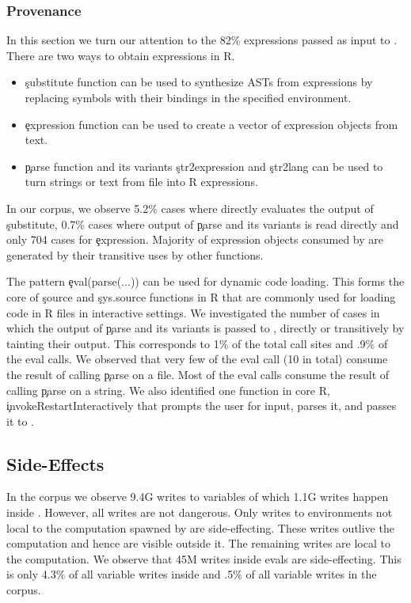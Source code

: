 \documentclass[conference]{IEEEtran}
\newcommand{\AllWritesRnd}{9.4G\xspace}
\newcommand{\EvalWritesRnd}{1.1G\xspace}
\newcommand{\EvalSideEffectingWritesRnd}{45M\xspace}
\newcommand{\EvalSideEffectingWritesEvalPerc}{4.3\%\xspace}
\newcommand{\EvalSideEffectingWritesAllPerc}{.5\%\xspace}
\newcommand{\AllExpressionInputEvalCallPerc}{82\%\xspace}
\newcommand{\PercentParsedEvals}{.9\%\xspace}
\newcommand{\PercentParsedCallSites}{1\%\xspace}
\newcommand{\NbParseFilesRnd}{10\xspace}
\begin{document}
\subsubsection{Provenance}

In this section we turn our attention to the \AllExpressionInputEvalCallPerc
expressions passed as input to \eval. There are two ways to obtain
expressions in R.
\begin{itemize}
  \item \c{substitute} function can be used to synthesize ASTs from
    expressions by replacing symbols with their bindings in the specified
    environment.
  \item \c{expression} function can be used to create a vector of expression
    objects from text.
  \item \c{parse} function and its variants \c{str2expression} and
    \c{str2lang} can be used to turn strings or text from file into R
    expressions.
\end{itemize}

In our corpus, we observe 5.2\% cases where \eval directly evaluates the
output of \c{substitute}, 0.7\% cases where output of \c{parse} and its
variants is read directly and only 704 cases for \c{expression}. Majority of
expression objects consumed by \eval are generated by their transitive uses
by other functions.

The pattern \c{eval(parse(...))} can be used for dynamic code loading. This
forms the core of \c{source} and \c{sys.source} functions in R that are
commonly used for loading code in R files in interactive settings. We
investigated the number of cases in which the output of \c{parse} and its
variants is passed to \eval, directly or transitively by tainting their
output. This corresponds to \PercentParsedCallSites of the total \eval call
sites and \PercentParsedEvals of the eval calls. We observed that very few
of the eval call (\NbParseFilesRnd in total) consume the result of calling
\c{parse} on a file. Most of the eval calls consume the result of calling
\c{parse} on a string.  We also identified one function in core R,
\c{invokeRestartInteractively} that prompts the user for input, parses it,
and passes it to \eval.

\subsection{Side-Effects}

In the corpus we observe \AllWritesRnd writes to variables of which
\EvalWritesRnd writes happen inside \eval. However, all writes are not
dangerous. Only writes to environments not local to the computation spawned
by \eval are side-effecting. These writes outlive the computation and hence are
visible outside it. The remaining writes are local to the
computation. We observe that \EvalSideEffectingWritesRnd writes inside evals are
side-effecting. This is only \EvalSideEffectingWritesEvalPerc of all variable
writes inside \eval and \EvalSideEffectingWritesAllPerc of all variable writes
in the corpus.
\end{document}
